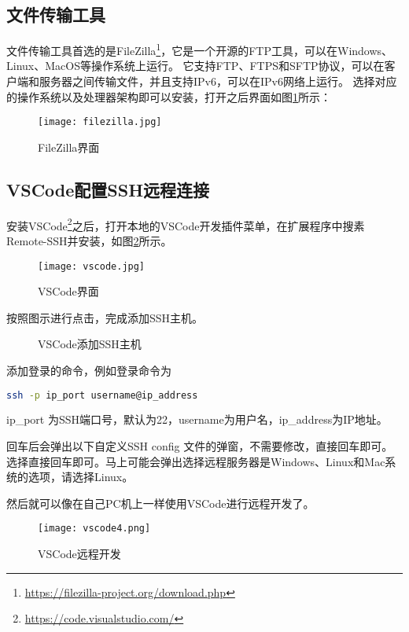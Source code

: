 \documentclass[lang=cn,a4paper,newtx]{elegantpaper}
\begin{document}
\subsection{文件传输工具}
文件传输工具首选的是FileZilla\footnote{\url{https://filezilla-project.org/download.php}}，它是一个开源的FTP工具，可以在Windows、Linux、MacOS等操作系统上运行。
它支持FTP、FTPS和SFTP协议，可以在客户端和服务器之间传输文件，并且支持IPv6，可以在IPv6网络上运行。
选择对应的操作系统以及处理器架构即可以安装，打开之后界面如图\ref{fig:filezilla}所示：

\begin{figure}[hbpt]
  \centering
  \texttt{[image: filezilla.jpg]}
  \caption{FileZilla界面}
  \label{fig:filezilla}
\end{figure}

\newpage
\subsection{VSCode配置SSH远程连接}
安装VSCode\footnote{\url{https://code.visualstudio.com/}}之后，打开本地的VSCode开发插件菜单，在扩展程序中搜素Remote-SSH并安装，如图\ref{fig:vscode}所示。

\begin{figure}[hbpt]
  \centering
  \texttt{[image: vscode.jpg]}
  \caption{VSCode界面}
  \label{fig:vscode}
\end{figure}

按照图示进行点击，完成添加SSH主机。
\begin{figure}[hbpt]
  \centering
  \quad
  \caption{VSCode添加SSH主机}
  \label{fig:vscode2}
\end{figure}

添加登录的命令，例如登录命令为
\begin{lstlisting}[language=bash]
  ssh -p ip_port username@ip_address
\end{lstlisting}

ip\_port 为SSH端口号，默认为22，username为用户名，ip\_address为IP地址。

回车后会弹出以下自定义SSH config 文件的弹窗，不需要修改，直接回车即可。
选择直接回车即可。马上可能会弹出选择远程服务器是Windows、Linux和Mac系统的选项，请选择Linux。

然后就可以像在自己PC机上一样使用VSCode进行远程开发了。
\begin{figure}
  \centering
  \texttt{[image: vscode4.png]}
  \caption{VSCode远程开发}
  \label{fig:vscode4}
\end{figure}
\end{document}

